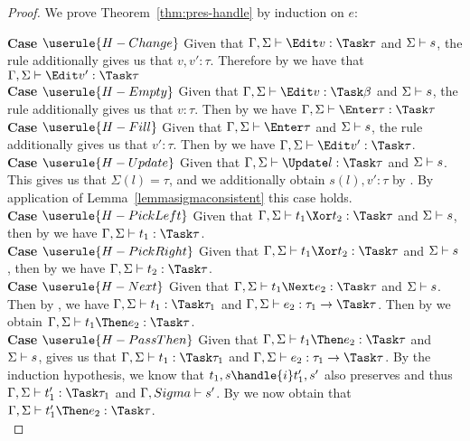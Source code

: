 \begin{proof}
  We prove Theorem~\ref{thm:pres-handle} by induction on $e$:

  \noindent\textbf{Case} $\userule{H-Change}$ Given that
  $\Gamma,\Sigma\infers\Edit v:\Task\tau$ and $\Sigma\vdash s$, the
   rule additionally gives us that $v,v':\tau$. Therefore by
   we have that $\Gamma,\Sigma\infers\Edit v':\Task\tau$\\

  \noindent\textbf{Case} $\userule{H-Empty}$ Given that
  $\Gamma,\Sigma\infers\Edit v:\Task\beta$ and $\Sigma\vdash s$, the
   rule additionally gives us that $v:\tau$. Then by
   we have $\Gamma,\Sigma\infers\Enter \tau:\Task\tau$ \\

  \noindent\textbf{Case} $\userule{H-Fill}$ Given that
  $\Gamma,\Sigma\infers\Enter\tau$ and $\Sigma\vdash s$, the 
  rule additionally gives us that $v':\tau$. Then by  we have
  $\Gamma,\Sigma\infers \Edit v':\Task\tau$.\\

  \noindent\textbf{Case} $\userule{H-Update}$ Given that
  $\Gamma,\Sigma\infers\Update l:\Task\tau$ and $\Sigma\vdash s$. This gives us
  that $\Sigma(l)=\tau$, and we additionally obtain $s(l),v':\tau$ by
  . By application of Lemma~\ref{lemmasigmaconsistent} this
  case holds.\\

  \noindent\textbf{Case} $\userule{H-PickLeft}$ Given that
  $\Gamma,\Sigma\infers t_1\Xor t_2:\Task\tau$ and $\Sigma\vdash s$, then by
   we have $\Gamma,\Sigma\infers t_1:\Task \tau$.\\

  \noindent\textbf{Case} $\userule{H-PickRight}$ Given that
  $\Gamma,\Sigma\infers t_1\Xor t_2:\Task\tau$ and $\Sigma\vdash s$, then by
   we have $\Gamma,\Sigma\infers t_2:\Task \tau$. \\

  \noindent\textbf{Case} $\userule{H-Next}$ Given that
  $\Gamma,\Sigma\infers t_1\Next e_2 :\Task\tau$ and $\Sigma\vdash s$. Then by
  , we have $\Gamma,\Sigma\infers t_1:\Task\tau_1$ and
  $\Gamma,\Sigma\infers e_2:\tau_1\to\Task\tau$. Then by  we
  obtain $\Gamma,\Sigma\infers t_1\Then e_2:\Task\tau$.\\

  \noindent\textbf{Case} $\userule{H-PassThen}$ Given that
  $\Gamma,\Sigma\infers t_1\Then e_2:\Task\tau$ and $\Sigma\vdash s$,
   gives us that $\Gamma,\Sigma\infers t_1:\Task\tau_1$ and
  $\Gamma,\Sigma\infers e_2:\tau_1\to\Task\tau$. By the induction hypothesis, we
  know that $t_1,s\handle{i}t_1',s'$ also preserves and thus
  $\Gamma,\Sigma\infers t_1':\Task\tau_1$ and $\Gamma,Sigma\vdash s'$. By
   we now obtain that
  $\Gamma,\Sigma\infers t_1'\Then e_2:\Task\tau$. \\


\end{proof}
